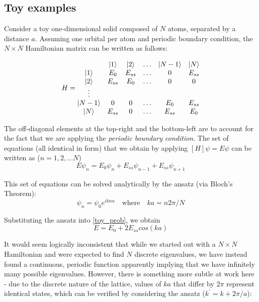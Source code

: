 \subsection{Toy examples}

Consider a toy one-dimensional solid composed of $N$ atoms, separated by a distance $a$. Assuming one orbital per atom and periodic boundary condition, the $N\times N$ Hamiltonian matrix can be written as follows:

\begin{equation}
H =
\begin{matrix}
     & \ket{1} & \ket{2} & \ldots & \ket{N-1} & \ket{N} \\
    \ket{1} & E_0 & E_{ss} & \ldots & 0 & E_{ss} \\
    \ket{2} & E_{ss} & E_0 & \ldots & 0 & 0 \\
    \vdots  &  &  &  &  &  \\
    \ket{N-1} & 0 & 0 & \ldots & E_0 & E_{ss} \\
    \ket{N} & E_{ss} & 0 & \ldots & E_{ss} & E_0 \\
\end{matrix}   
\end{equation}

The off-diagonal elements at the top-right and the bottom-left are to account for the fact that we are applying the \textit{periodic boundary condition}. The set of equations (all identical in form) that we obtain by applying $[H]\psi = E\psi$ can be written as ($n = 1, 2,\ldots N$)
\begin{equation*} \label{toy_prob}
    E\psi_{n} = E_0\psi_{n} + E_{ss}\psi_{n-1} + E_{ss}\psi_{n+1}
\end{equation*}

This set of equations can be solved analytically by the ansatz (via Bloch's Theorem):
\begin{equation*} 
    \psi_{n} = \psi_0 e^{ikna} \quad \text{where} \quad ka = n2\pi/N
\end{equation*}

Substituting the ansatz into \ref{toy_prob}, we obtain
\begin{equation}
    E = E_0 + 2E_{ss}cos(ka)
\end{equation}

It would seem logically inconsistent that while we started out with a $N \times N$ Hamiltonian and were expected to find $N$ discrete eigenvalues, we have instead found a continuous, periodic function apparently implying that we have infinitely many possible eigenvalues. However, there is something more subtle at work here - due to the discrete nature of the lattice, values of $ka$ that differ by $2\pi$ represent identical states, which can be verified by considering the ansatz ($k^{'} = k + 2\pi/a$):

